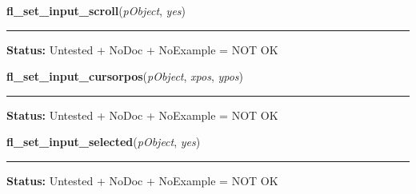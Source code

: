     \label{xformslib:library:fl_set_input_scroll}

    \vspace{0.5ex}

\hspace{.8\funcindent}\begin{boxedminipage}{\funcwidth}

    \raggedright \textbf{fl\_set\_input\_scroll}(\textit{pObject}, \textit{yes})

    \vspace{-1.5ex}

    \rule{\textwidth}{0.5\fboxrule}
\setlength{\parskip}{2ex}
\setlength{\parskip}{1ex}
\textbf{Status:} Untested + NoDoc + NoExample = NOT OK



    \end{boxedminipage}

    \label{xformslib:library:fl_set_input_cursorpos}

    \vspace{0.5ex}

\hspace{.8\funcindent}\begin{boxedminipage}{\funcwidth}

    \raggedright \textbf{fl\_set\_input\_cursorpos}(\textit{pObject}, \textit{xpos}, \textit{ypos})

    \vspace{-1.5ex}

    \rule{\textwidth}{0.5\fboxrule}
\setlength{\parskip}{2ex}
\setlength{\parskip}{1ex}
\textbf{Status:} Untested + NoDoc + NoExample = NOT OK



    \end{boxedminipage}

    \label{xformslib:library:fl_set_input_selected}

    \vspace{0.5ex}

\hspace{.8\funcindent}\begin{boxedminipage}{\funcwidth}

    \raggedright \textbf{fl\_set\_input\_selected}(\textit{pObject}, \textit{yes})

    \vspace{-1.5ex}

    \rule{\textwidth}{0.5\fboxrule}
\setlength{\parskip}{2ex}
\setlength{\parskip}{1ex}
\textbf{Status:} Untested + NoDoc + NoExample = NOT OK



    \end{boxedminipage}


